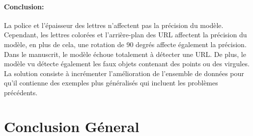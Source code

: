           \paragraph{Conclusion:} La police et l'épaisseur des lettres n'affectent pas la précision du modèle. Cependant, les lettres colorées et l'arrière-plan des URL affectent la précision du modèle, en plus de cela, une rotation de 90 degrés affecte également la précision. Dans le manuscrit, le modèle échoue totalement à détecter une URL. De plus, le modèle vu détecte également les faux objets contenant des points ou des virgules.
          La solution consiste à incrémenter l'amélioration de l'ensemble de données pour qu'il contienne des exemples plus généralisés qui incluent les problèmes précédents.

\section{Conclusion Géneral}